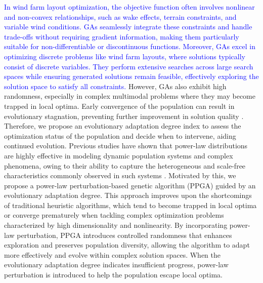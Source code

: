 \documentclass[journal,twoside]{IEEEtran}
\begin{document}
    \textcolor{blue}{In wind farm layout optimization, the objective function often involves nonlinear and non-convex relationships, such as wake effects, terrain constraints, and variable wind conditions. GAs seamlessly integrate these constraints and handle trade-offs without requiring gradient information, making them particularly suitable for non-differentiable or discontinuous functions. Moreover, GAs excel in optimizing discrete problems like wind farm layouts, where solutions typically consist of discrete variables. They perform extensive searches across large search spaces while ensuring generated solutions remain feasible, effectively exploring the solution space to satisfy all constraints.} However, GAs also exhibit high randomness, especially in complex multimodal problems where they may become trapped in local optima. Early convergence of the population can result in evolutionary stagnation, preventing further improvement in solution quality \cite{wang2020multi,kirchner2024wind}. Therefore, we propose an evolutionary adaptation degree index to assess the optimization status of the population and decide when to intervene, aiding continued evolution. Previous studies have shown that power-law distributions are highly effective in modeling dynamic population systems and complex phenomena, owing to their ability to capture the heterogeneous and scale-free characteristics commonly observed in such systems \cite{holme2019rare}. Motivated by this, we propose a power-law perturbation-based genetic algorithm (PPGA) guided by an evolutionary adaptation degree. This approach improves upon the shortcomings of traditional heuristic algorithms, which tend to become trapped in local optima or converge prematurely when tackling complex optimization problems characterized by high dimensionality and nonlinearity. By incorporating power-law perturbation, PPGA introduces controlled randomness that enhances exploration and preserves population diversity, allowing the algorithm to adapt more effectively and evolve within complex solution spaces. When the evolutionary adaptation degree indicates insufficient progress, power-law perturbation is introduced to help the population escape local optima.
    
\end{document}
